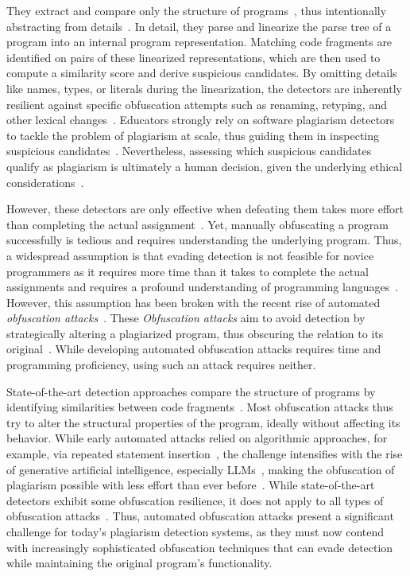 They extract and compare only the structure of programs~\cite{Novak2019}, thus intentionally abstracting from details~\cite{prechelt2002}.
In detail, they parse and linearize the parse tree of a program into an internal program representation.
Matching code fragments are identified on pairs of these linearized representations, which are then used to compute a similarity score and derive suspicious candidates.
By omitting details like names, types, or literals during the linearization, the detectors are inherently resilient against specific obfuscation attempts such as renaming, retyping, and other lexical changes~\cite{Joy1999, prechelt2000}.
Educators strongly rely on software plagiarism detectors to tackle the problem of plagiarism at scale, thus guiding them in inspecting suspicious candidates~\cite{BottoTobar2022}.
Nevertheless, assessing which suspicious candidates qualify as plagiarism is ultimately a human decision, given the underlying ethical considerations~\cite{Culwin2001, Weber2019}.

However, these detectors are only effective when defeating them takes more effort than completing the actual assignment~\cite{DevoreMcDonald2020}.
Yet, manually obfuscating a program successfully is tedious and requires understanding the underlying program.
Thus, a widespread assumption is that evading detection is not feasible for novice programmers as it requires more time than it takes to complete the actual assignments and requires a profound understanding of programming languages~\cite{Joy1999}.
%
However, this assumption has been broken with the recent rise of automated \textit{obfuscation attacks}~\cite{DevoreMcDonald2020, Foltynek2020, Biderman2022, Pawelczak2018}.
These \textit{Obfuscation attacks} aim to avoid detection by strategically altering a plagiarized program, thus obscuring the relation to its original~\cite{Saglam2024b}.
While developing automated obfuscation attacks requires time and programming proficiency, using such an attack requires neither.

State-of-the-art detection approaches compare the structure of programs by identifying similarities between code fragments~\cite{Nichols2019}. Most obfuscation attacks thus try to alter the structural properties of the program, ideally without affecting its behavior.
%
While early automated attacks relied on algorithmic approaches, for example, via repeated statement insertion~\cite{DevoreMcDonald2020}, the challenge intensifies with the rise of generative artificial intelligence, especially \acp{LLM}~\cite{ChatGPTGuide, Daun2023}, making the obfuscation of plagiarism possible with less effort than ever before~\cite{Khalil_Er_2023, Saglam2024a}. 
While state-of-the-art detectors exhibit some obfuscation resilience, it does not apply to all types of obfuscation attacks~\cite{DevoreMcDonald2020, Luo2017}.
%
Thus, automated obfuscation attacks present a significant challenge for today's plagiarism detection systems, as they must now contend with increasingly sophisticated obfuscation techniques that can evade detection while maintaining the original program's functionality.

